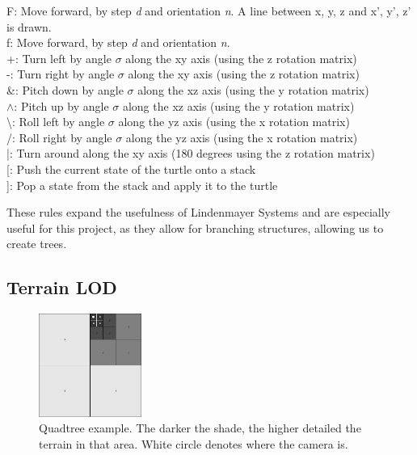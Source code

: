 \documentclass[a4paper,10pt]{report}
\begin{document}
F: Move forward, by step \textit{d} and orientation \textit{n}. A line between {x, y, z} and {x', y', z'} is drawn. \\

f: Move forward, by step \textit{d} and orientation \textit{n}. \\

+: Turn left by angle $\sigma$ along the xy axis (using the z rotation matrix)\\

-: Turn right by angle $\sigma$ along the xy axis (using the z rotation matrix)\\

\&: Pitch down by angle $\sigma$ along the xz axis (using the y rotation matrix)\\

$\wedge$: Pitch up by angle $\sigma$ along the xz axis (using the y rotation matrix)\\

\textbackslash: Roll left by angle $\sigma$ along the yz axis (using the x rotation matrix)\\

/: Roll right by angle $\sigma$ along the yz axis (using the x rotation matrix)\\

|: Turn around along the xy axis (180 degrees using the z rotation matrix)\\

[: Push the current state of the turtle onto a stack\\

]: Pop a state from the stack and apply it to the turtle\medskip

These rules expand the usefulness of Lindenmayer Systems and are especially useful for this project, as they allow for branching structures, allowing us to create trees.

\clearpage
\subsection{Terrain LOD}

\begin{figure}[h!]
    \centering
  \includegraphics[width=0.3\textwidth]{QuadTree.png}
 \caption{Quadtree example. The darker the shade, the higher detailed the terrain in that area. White circle denotes where the camera is.}
 \label{fig:quad_tree}
\end{figure}
\end{document}
